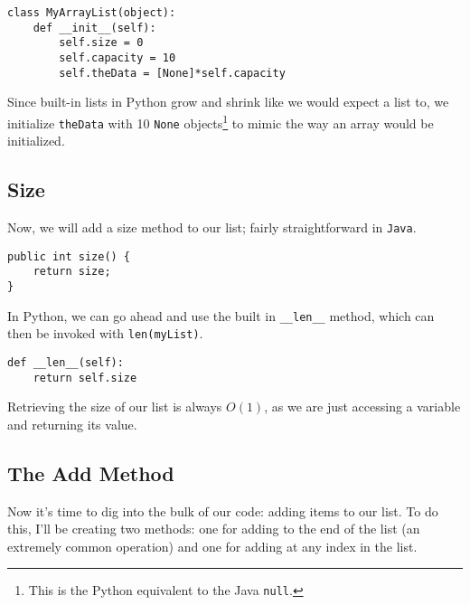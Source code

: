 \begin{verbatim}
class MyArrayList(object):
	def __init__(self):
		self.size = 0
		self.capacity = 10
		self.theData = [None]*self.capacity
\end{verbatim}

Since built-in lists in Python grow and shrink like we would expect a list to, we initialize \texttt{theData} with 10 \texttt{None} objects\footnote{This is the Python equivalent to the Java \texttt{null}.} to mimic the way an array would be initialized.



%
%
%

\subsection{Size}
Now, we will add a size method to our list; fairly straightforward in \texttt{Java}.

\begin{verbatim}
public int size() {  
	return size;
}
\end{verbatim}

In Python, we can go ahead and use the built in \texttt{\_\_len\_\_} method, which can then be invoked with \texttt{len(myList)}.

\begin{verbatim}
def __len__(self):
	return self.size
\end{verbatim}




Retrieving the size of our list is always $O(1)$, as we are just accessing a variable and returning its value.

\subsection{The Add Method}
Now it's time to dig into the bulk of our code: adding items to our list.
To do this, I'll be creating two methods:  one for adding to the end of the list (an extremely common operation) and one for adding at any index in the list.

